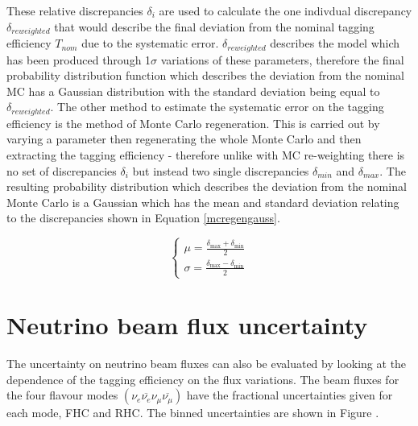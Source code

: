 These relative discrepancies $\delta_{i}$ are used to calculate the one indivdual discrepancy $\delta_{reweighted}$ that would describe the final deviation from the nominal tagging efficiency $T_{nom}$ due to the systematic error. $\delta_{reweighted}$ describes the model which has been produced through 1$\sigma$ variations of these parameters, therefore the final probability distribution function which describes the deviation from the nominal MC has a Gaussian distribution with the standard deviation being equal to $\delta_{reweighted}$. 
\newline
The other method to estimate the systematic error on the tagging efficiency is the method of Monte Carlo regeneration. This is carried out by varying a parameter then regenerating the whole Monte Carlo and then extracting the tagging efficiency - therefore unlike with MC re-weighting there is no set of discrepancies $\delta_{i}$ but instead two single discrepancies $\delta_{min}$ and $\delta_{max}$. The resulting probability distribution which describes the deviation from the nominal Monte Carlo is a Gaussian which has the mean and standard deviation relating to the discrepancies shown in Equation \eqref{mcregengauss}.
\newline

\begin{equation}
\left\{\begin{array}{l}
\mu=\frac{\delta_{\max }+\delta_{\min }}{2} \\
\sigma=\frac{\delta_{\max }-\delta_{\min }}{2}
\end{array}\right.
\label{mcregengauss}
\end{equation}


\section{Neutrino beam flux uncertainty}

The uncertainty on neutrino beam fluxes can also be evaluated by looking at the dependence of the tagging efficiency on the flux variations. The beam fluxes for the four flavour modes 
$\left(\nu_{e} \overline{\nu_{e}} \nu_{\mu} \overline{\nu_{\mu}}\right)$ have the fractional uncertainties given for each mode, FHC and RHC. The binned uncertainties are shown in Figure .


